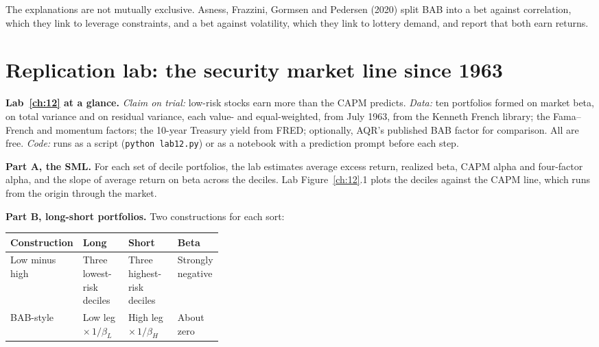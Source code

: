 The explanations are not mutually exclusive. Asness, Frazzini, Gormsen and Pedersen (2020) split BAB into a bet against correlation, which they link to leverage constraints, and a bet against volatility, which they link to lottery demand, and report that both earn returns.

\section{Replication lab: the security market line since 1963}
\label{sec:12-lab}

\begin{callout}
\textbf{Lab~\ref{ch:12} at a glance.} \emph{Claim on trial:} low-risk stocks earn more than the CAPM predicts. \emph{Data:} ten portfolios formed on market beta, on total variance and on residual variance, each value- and equal-weighted, from July 1963, from the Kenneth French library; the Fama--French and momentum factors; the 10-year Treasury yield from FRED; optionally, AQR's published BAB factor for comparison. All are free. \emph{Code:} runs as a script (\texttt{python lab12.py}) or as a notebook with a prediction prompt before each step.
\end{callout}

\textbf{Part A, the SML.} For each set of decile portfolios, the lab estimates average excess return, realized beta, CAPM alpha and four-factor alpha, and the slope of average return on beta across the deciles. Lab Figure~\ref{ch:12}.1 plots the deciles against the CAPM line, which runs from the origin through the market.

\textbf{Part B, long-short portfolios.} Two constructions for each sort:

\begin{center}
\small
\begin{tabularx}{0.9\linewidth}{@{}>{\raggedright\arraybackslash}p{0.19\linewidth}>{\raggedright\arraybackslash}X>{\raggedright\arraybackslash}X>{\raggedright\arraybackslash}p{0.17\linewidth}@{}}
\toprule
Construction & Long & Short & Beta \\
\midrule
Low minus high & Three lowest-risk deciles & Three highest-risk deciles & Strongly negative \\
BAB-style & Low leg $\times\, 1/\beta_L$ & High leg $\times\, 1/\beta_H$ & About zero \\
\bottomrule
\end{tabularx}
\end{center}


